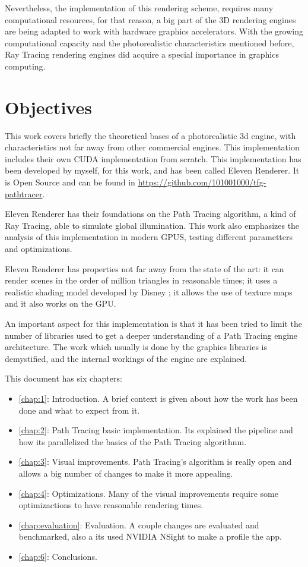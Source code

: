 Nevertheless, the implementation of this rendering scheme, requires many computational resources, for that reason, a big part of the 3D rendering engines are being adapted to work with hardware graphics accelerators. With the growing computational capacity and the photorealistic characteristics mentioned before, Ray Tracing rendering engines did acquire a special importance in graphics computing.

\section{Objectives}
	
This work covers briefly the theoretical bases of a photorealistic 3d engine, with characteristics not far away from other commercial engines. This implementation includes their own CUDA implementation from scratch. This implementation has been developed by myself, for this work, and has been called Eleven Renderer. It is Open Source and can be found in \url{https://github.com/101001000/tfg-pathtracer}.

Eleven Renderer has their foundations on the Path Tracing algorithm, a kind of Ray Tracing, able to simulate global illumination. This work also emphasizes the analysis of this implementation in modern GPUS, testing different parametters and optimizations.

Eleven Renderer has properties not far away from the state of the art: it can render scenes in the order of million triangles in reasonable times; it uses a realistic shading model developed by Disney \cite{burley2012physically}; it allows the use of texture maps and it also works on the GPU.

An important aspect for this implementation is that it has been tried to limit the number of libraries used to get a deeper understanding of a Path Tracing engine architecture. The work which usually is done by the graphics libraries is demystified, and the internal workings of the engine are explained.


This document has six chapters:


\begin{itemize}
	\item \autoref{chap:1}: Introduction. A brief context is given about how the work has been done and what to expect from it.
	\item \autoref{chap:2}: Path Tracing basic implementation. Its explained the pipeline and how its parallelized the basics of the Path Tracing algorithnm. 
	\item \autoref{chap:3}: Visual improvements. Path Tracing's algorithm is really open and allows a big number of changes to make it more appealing.
	\item \autoref{chap:4}: Optimizations. Many of the visual improvements require some optimizactions to have reasonable rendering times.
	\item \autoref{chap:evaluation}: Evaluation. A couple changes are evaluated and benchmarked, also a its used NVIDIA NSight to make a profile the app.
	\item \autoref{chap:6}: Conclusions.
\end{itemize}

